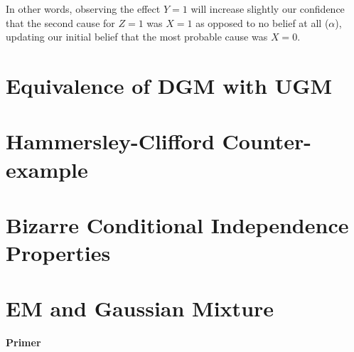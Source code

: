\documentclass{article}
\numberwithin{equation}{section}
\begin{document}
In other words, observing the effect $Y = 1$ will increase slightly our confidence 
that the second cause for $Z = 1$ was $X = 1$ as opposed to no belief at all 
($\alpha$), updating our initial belief that the 
most probable cause was $X = 0$.


\section{Equivalence of DGM with UGM}

\section{Hammersley-Clifford Counter-example}

\section{Bizarre Conditional Independence Properties}

\section{EM and Gaussian Mixture}
\textbf{Primer}
\end{document}
